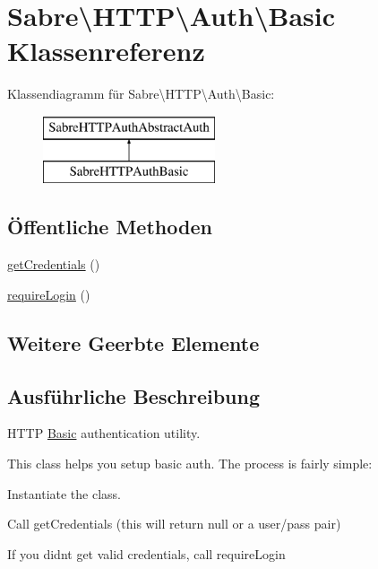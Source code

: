 \hypertarget{class_sabre_1_1_h_t_t_p_1_1_auth_1_1_basic}{}\section{Sabre\textbackslash{}H\+T\+TP\textbackslash{}Auth\textbackslash{}Basic Klassenreferenz}
\label{class_sabre_1_1_h_t_t_p_1_1_auth_1_1_basic}
Klassendiagramm für Sabre\textbackslash{}H\+T\+TP\textbackslash{}Auth\textbackslash{}Basic\+:\begin{figure}[H]
\begin{center}
\leavevmode
\includegraphics[height=2.000000cm]{class_sabre_1_1_h_t_t_p_1_1_auth_1_1_basic}
\end{center}
\end{figure}
\subsection*{Öffentliche Methoden}
\begin{DoxyCompactItemize}
\item 
\mbox{\hyperlink{class_sabre_1_1_h_t_t_p_1_1_auth_1_1_basic_ab52f197bdfaa2154e80995923fdadcd3}{get\+Credentials}} ()
\item 
\mbox{\hyperlink{class_sabre_1_1_h_t_t_p_1_1_auth_1_1_basic_a89af6546622194a90176057eaff6d4c8}{require\+Login}} ()
\end{DoxyCompactItemize}
\subsection*{Weitere Geerbte Elemente}


\subsection{Ausführliche Beschreibung}
H\+T\+TP \mbox{\hyperlink{class_sabre_1_1_h_t_t_p_1_1_auth_1_1_basic}{Basic}} authentication utility.

This class helps you setup basic auth. The process is fairly simple\+:


\begin{DoxyEnumerate}
\item Instantiate the class.
\item Call get\+Credentials (this will return null or a user/pass pair)
\item If you didn\textquotesingle{}t get valid credentials, call \textquotesingle{}require\+Login\textquotesingle{}
\end{DoxyEnumerate}

